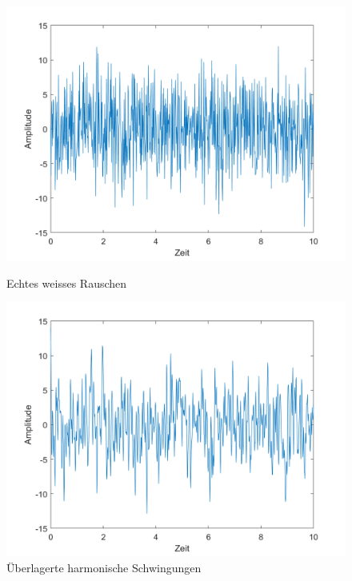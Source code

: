 \begin{figure}
	\centering
	\begin{minipage}{0.45\textwidth}
		\centering
		\includegraphics[width=\linewidth]{papers/brown/images/weissesRauschen.png}
		\caption{Echtes weisses Rauschen}
		\label{weissesRauschenSignal}
	\end{minipage}
	\hspace{0.05\linewidth}
	\begin{minipage}{0.45\textwidth}
		\centering
		\includegraphics[width=\linewidth]{papers/brown/images/RauschenDurchUeberlagerteHarmonsicheSchwingungen.png}
		\caption{Überlagerte harmonische Schwingungen}
		\label{überlagerteSchwingungen}
	\end{minipage}

\end{figure}
